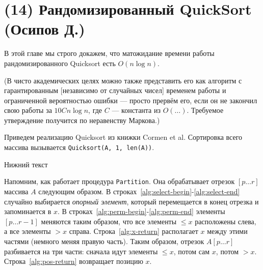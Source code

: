 \section{(14) Рандомизированный QuickSort (Осипов Д.)}

В этой главе мы строго докажем, что матожидание времени работы рандомизированного Quicksort есть $O(n\log n)$.

(В чисто академических целях можно также представить его как алгоритм
с гарантированным [независимо от случайных чисел] временем работы
и ограниченной вероятностью ошибки ---
просто прервём его, если он не закончил свою работы
за $10Cn\log n$, где $C$ --- константа из $O(\ldots)$.
Требуемое утверждение получится по неравенству Маркова.)

Приведем реализацию Quicksort из книжки Cormen et al. Сортировка всего массива вызывается \texttt{Quicksort(A, 1, len(A))}.

\begin{algorithm}[H]
	\caption{Нижний текст}
	\DontPrintSemicolon
	\;
\end{algorithm}


Напомним, как работает процедура \texttt{Partition}. Она обрабатывает отрезок $[p\ldots r]$ массива $A$ следующим образом.  В строках~\ref{alg:select-begin}-\ref{alg:select-end} случайно выбирается \textit{опорный элемент}, который перемещается в конец отрезка и запоминается в $x$. В строках~\ref{alg:perm-begin}-\ref{alg:perm-end} элементы $[p\ldots r-1]$ меняются таким образом, что все элементы $\leq x$ расположены слева, а все элементы $> x$ справа. Строка~\ref{alg:x-return} располагает $x$ между этими частями (немного меняя правую часть). Таким образом, отрезок $A[p\ldots r]$ разбивается на три части: сначала идут элементы $\leq x$, потом сам $x$, потом $>x$. Строка~\ref{alg:pos-return} возвращает позицию $x$.


